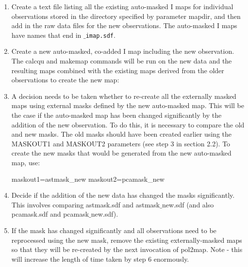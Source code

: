 \begin{enumerate}

\item Create a text file listing all the existing auto-masked I maps
  for individual observations stored in the directory specified by
  parameter mapdir, and then add in the raw data files for the new
  observations. The auto-masked I maps have names that end in
  \texttt{$\_$imap.sdf}.

\begin{terminalv}
\end{terminalv}


\item Create a new auto-masked, co-added I map including the new
  observation. The calcqu and makemap commands will be run on the new
  data and the resulting maps combined with the existing maps derived
  from the older observations to create the new map:

\begin{terminalv}
\end{terminalv}


\item A decision needs to be taken whether to re-create all the
  externally masked maps using external masks defined by the new
  auto-masked map. This will be the case if the auto-masked map has
  been changed significantly by the addition of the new
  observation. To do this, it is necessary to compare the old and new
  masks. The old masks should have been created earlier using the
  MASKOUT1 and MASKOUT2 parameters (see step 3 in section 2.2). To
  create the new masks that would be generated from the new
  auto-masked map, use:

\begin{terminalv}
maskout1=astmask_new           maskout2=pcamask_new
\end{terminalv}


\item Decide if the addition of the new data has changed the masks
  significantly. This involves comparing astmask.sdf and
  astmask$\_$new.sdf (and also pcamask.sdf and pcamask$\_$new.sdf).


\item If the mask has changed significantly and all observations need
  to be reprocessed using the new mask, remove the existing
  externally-masked maps so that they will be re-created by the next
  invocation of pol2map.  Note - this will increase the length of time
  taken by step 6 enormously.


\end{enumerate}
